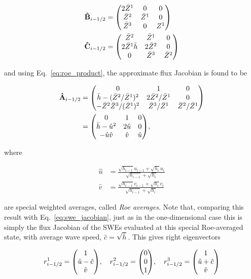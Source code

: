 \begin{align}
  \vu B_{i-1/2} &= \mqty(
    2\bar Z^1 & 0 & 0 \\
    \bar Z^2 & \bar Z^1 & 0 \\
    \bar Z^3 & 0 & Z^1
  ) \\
  \vu C_{i-1/2} &= \mqty(
    \bar Z^2 & \bar Z^1 & 0 \\
    2 \bar Z^1 \bar h & 2\bar Z^2 & 0 \\
    0 & \bar Z^3 & \bar Z^2
  )
\end{align}

and using Eq.~\ref{eq:roe_product}, the approximate flux Jacobian is found to be

\begin{align}
  \vu A_{i-1/2} &= \mqty(
    0 & 1 & 0 \\
    \bar h - (\bar Z^2 / \bar Z^1)^2 & 2 \bar Z^2 / \bar Z^1 & 0 \\
    - \bar Z^2 \bar Z^3 / (\bar Z^1)^2 & \bar Z^3 / \bar Z^1 & \bar Z^2 / \bar Z^1
  ) \\
  &= \mqty(
    0 & 1 & 0 \\
    \bar h - \hat u^2 & 2 \hat u & 0 \\
    -\hat u\hat v & \hat v & \hat u
  ),
\end{align}

where

\begin{align}
  \hat u &= \frac{\sqrt{h_{i-1}}u_{i-1}+\sqrt{h_i}u_i}{\sqrt{h_{i-1}}+\sqrt{h_i}} \\
  \hat v &= \frac{\sqrt{h_{i-1}}v_{i-1}+\sqrt{h_i}v_i}{\sqrt{h_{i-1}}+\sqrt{h_i}}
\end{align}

are special weighted averages, called \emph{Roe averages}. Note that, comparing this result with Eq.~\ref{eq:swe_jacobian}, just as in the one-dimensional case this is simply the flux Jacobian of the SWEs evaluated at this special Roe-averaged state, with average wave speed, $\hat c = \sqrt{\bar h}$. This gives right eigenvectors

\begin{align}
  r_{i-1/2}^1 = \mqty(1 \\ \hat u - \hat c \\ \hat v) \qc
  r_{i-1/2}^2 = \mqty(0 \\ 0 \\ 1) \qc
  r_{i-1/2}^3 = \mqty(1 \\ \hat u + \hat c \\ \hat v)
\end{align}

